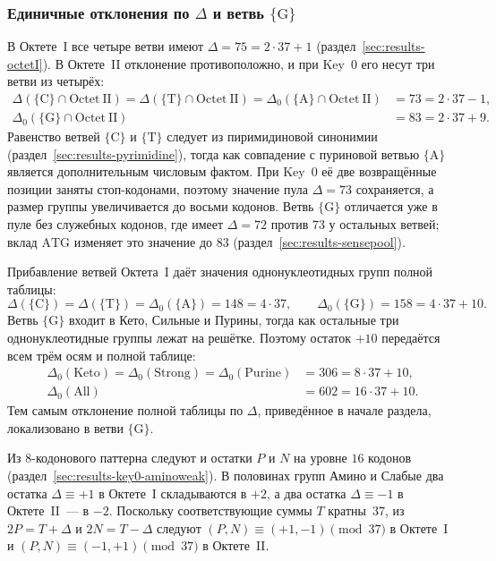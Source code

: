\documentclass[11pt,a4paper]{article}
\renewcommand{\_}{\origunderscore\allowbreak}
\begin{document}
\subsubsection{Единичные отклонения по
\texorpdfstring{$\Delta$}{Delta} и ветвь
\texorpdfstring{$\{\mathrm{G}\}$}{G}}
\label{sec:results-key0-delta}

В Октете~I все четыре ветви имеют
$\Delta=75=2\cdot37+1$
(раздел~\ref{sec:results-octetI}). В Октете~II отклонение
противоположно, и при Key~0 его несут три ветви из четырёх:
\[
\begin{aligned}
\Delta(\{\mathrm{C}\}\cap\mathrm{Octet~II})
  =\Delta(\{\mathrm{T}\}\cap\mathrm{Octet~II})
  =\Delta_{0}(\{\mathrm{A}\}\cap\mathrm{Octet~II})
  &=73=2\cdot37-1, \\
\Delta_{0}(\{\mathrm{G}\}\cap\mathrm{Octet~II})
  &=83=2\cdot37+9.
\end{aligned}
\]
Равенство ветвей $\{\mathrm{C}\}$ и $\{\mathrm{T}\}$ следует из
пиримидиновой синонимии
(раздел~\ref{sec:results-pyrimidine}), тогда как совпадение с
пуриновой ветвью $\{\mathrm{A}\}$ является дополнительным числовым
фактом. При Key~0 её две возвращённые позиции заняты стоп-кодонами,
поэтому значение пула $\Delta=73$ сохраняется, а размер группы
увеличивается до восьми кодонов. Ветвь $\{\mathrm{G}\}$ отличается
уже в пуле без служебных кодонов, где имеет $\Delta=72$ против $73$ у остальных ветвей;
вклад $\mathrm{ATG}$ изменяет это значение до $83$
(раздел~\ref{sec:results-sensepool}).

Прибавление ветвей Октета~I даёт значения однонуклеотидных групп
полной таблицы:
\[
\Delta(\{\mathrm{C}\})=\Delta(\{\mathrm{T}\})
  =\Delta_{0}(\{\mathrm{A}\})=148=4\cdot37,
\qquad
\Delta_{0}(\{\mathrm{G}\})=158=4\cdot37+10.
\]
Ветвь $\{\mathrm{G}\}$ входит в Кето, Сильные и Пурины, тогда как
остальные три однонуклеотидные группы лежат на решётке. Поэтому
остаток $+10$ передаётся всем трём осям и полной таблице:
\[
\begin{aligned}
\Delta_{0}(\mathrm{Keto})
  =\Delta_{0}(\mathrm{Strong})
  =\Delta_{0}(\mathrm{Purine})
  &=306=8\cdot37+10, \\
\Delta_{0}(\mathrm{All})
  &=602=16\cdot37+10.
\end{aligned}
\]
Тем самым отклонение полной таблицы по $\Delta$, приведённое в
начале раздела, локализовано в ветви $\{\mathrm{G}\}$.

Из $8$-кодонового паттерна следуют и остатки $P$ и $N$ на уровне
$16$ кодонов (раздел~\ref{sec:results-key0-aminoweak}). В половинах
групп Амино и Слабые два остатка $\Delta\equiv+1$ в Октете~I
складываются в $+2$, а два остатка $\Delta\equiv-1$ в
Октете~II~--- в $-2$. Поскольку соответствующие суммы $T$
кратны~$37$, из $2P=T+\Delta$ и $2N=T-\Delta$ следуют
$(P,N)\equiv(+1,-1)\pmod{37}$ в Октете~I и
$(P,N)\equiv(-1,+1)\pmod{37}$ в Октете~II.
\end{document}
